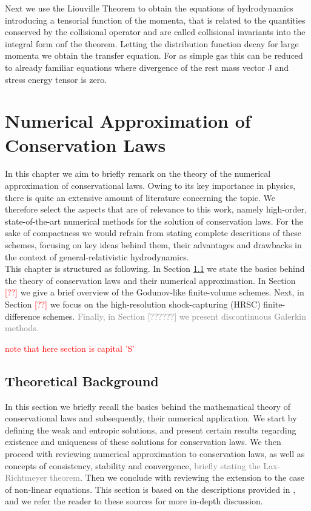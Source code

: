 \documentclass[11pt,a4paper,headinclude=true,DIV=14,BCOR=8mm,chapterprefix,listof=totoc,twoside,openright,abstracton]{scrbook}
\begin{document}
Next we use the Liouville Theorem to obtain the equations of hydrodynamics introducing a tensorial function of the momenta, that is related to the quantities conserved by the collisional operator and are called collisional invariants into the integral form onf the theorem. Letting the distribution function decay for large momenta we obtain the transfer equation. For as simple gas this can be reduced to already familiar equations where divergence of the rest mass vector J and stress energy tensor is zero. 


\chapter{Numerical Approximation of Conservation Laws}

In this chapter we aim to briefly remark on the theory of the numerical approximation of conservational laws. Owing to its key importance in physics, there is quite an extensive amount of literature concerning the topic. We therefore select the aspects that are of relevance to this work, namely high-order, state-of-the-art numerical methods for the solution of conservation laws. For the sake of compactness we would refrain from stating complete descritions of these schemes, focusing on key ideas behind them, their advantages and drawbacks in the context of general-relativistic hydrodynamics. \\

This chapter is structured as following. In Section \ref{sec:theory:conserv_laws:theorback} we state the basics behind the theory of conservation laws and their numerical approximation. In Section \textcolor{red}{[??]} we give a brief overview of the Godunov-like finite-volume schemes. Next, in Section \textcolor{red}{[??]} we focus on the high-resolution shock-capturing (HRSC) finite-difference schemes. \textcolor{gray}{Finally, in Section [??????] we present discontinuous Galerkin methods.}

\textcolor{red}{note that here section is capital 'S'}

\section{Theoretical Background}
\label{sec:theory:conserv_laws:theorback}

In this section we briefly recall the basics behind the mathematical theory of conservational laws and subsequently, their numerical application. We start by defining the weak and entropic solutions, and present certain results regarding existence and uniqueness of these solutions for conservation laws. We then proceed with reviewing numerical approximation to conservation laws, as well as concepts of consistency, stability and convergence, \textcolor{gray}{briefly stating the Lax-Richtmeyer theorem}. Then we conclude with reviewing the extension to the case of non-linear equations. This section is based on the descriptions provided in \cite{LeVeque:1992,Tadmor1998}, and we refer the reader to these sources for more in-depth discussion. \\
\end{document}
